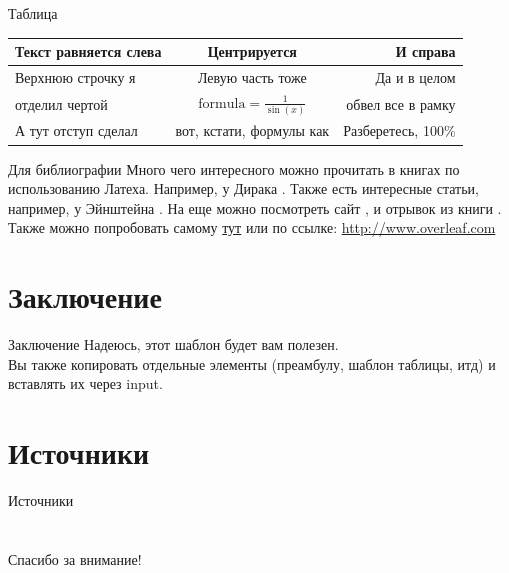 \documentclass[11pt]{beamer} %
\begin{document}
    \begin{frame}{Таблица}
        \begin{table}[h!]
            \centering
            \begin{tabular}{| l | c r |}
                \hline
                Текст равняется слева & Центрируется & И справа \\
                \hline
                Верхнюю строчку я  & Левую часть тоже & Да и в целом \\
                отделил чертой & $\text{formula} = \frac{1}{\sin(x)}$ & обвел все в рамку \\ [1ex]
                А тут отступ сделал & вот, кстати, формулы как & Разберетесь, 100\% \\
                \hline
            \end{tabular}
        \end{table}
    \end{frame}
    \begin{frame}{Для библиографии}
        Много чего интересного можно прочитать в книгах по использованию Латеха. Например, у Дирака \cite{dirac}. Также есть интересные статьи, например, у Эйнштейна \cite{einstein}. На еще можно посмотреть сайт \cite{knuthwebsite}, и отрывок из книги \cite{knuth-fa}.\\
        Также можно попробовать самому \href{http://www.overleaf.com}{тут}  или по ссылке: \url{http://www.overleaf.com}
    \end{frame}

\section{Заключение}
    \begin{frame}{Заключение}
        \centering
        {\LARGE Надеюсь, этот шаблон будет вам полезен.}\\
        {\tiny Вы также копировать отдельные элементы (преамбулу, шаблон таблицы, итд) и вставлять их через input.}
    \end{frame}

\section{Источники}
    \begin{frame}{Источники}
        \printbibliography
    \end{frame}

\section*{}  
    \begin{frame}
        \textcolor{darkblueNES}{\Huge{\centerline{Спасибо за внимание!}}}
    \end{frame}
\end{document}
